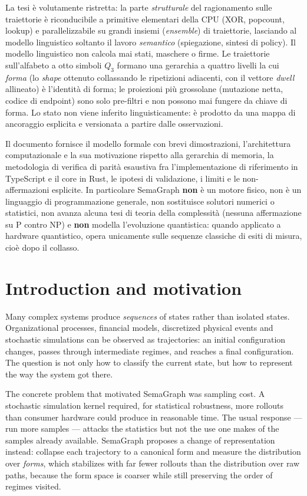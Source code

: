 \documentclass[11pt,a4paper]{article}
\begin{document}
La tesi è volutamente ristretta: la parte \emph{strutturale} del ragionamento
sulle traiettorie è riconducibile a primitive elementari della CPU (XOR, popcount,
lookup) e parallelizzabile su grandi insiemi (\emph{ensemble}) di traiettorie,
lasciando al modello linguistico soltanto il lavoro \emph{semantico} (spiegazione,
sintesi di policy). Il modello linguistico non calcola mai stati, maschere o
firme. Le traiettorie sull'alfabeto a otto simboli $Q_3$ formano una gerarchia a
quattro livelli la cui \emph{forma} (lo \emph{shape} ottenuto collassando le
ripetizioni adiacenti, con il vettore \emph{dwell} allineato) è l'identità di
forma; le proiezioni più grossolane (mutazione netta, codice di endpoint) sono
solo pre-filtri e non possono mai fungere da chiave di forma. Lo stato non viene
inferito linguisticamente: è prodotto da una mappa di ancoraggio esplicita e
versionata a partire dalle osservazioni.

Il documento fornisce il modello formale con brevi dimostrazioni, l'architettura
computazionale e la sua motivazione rispetto alla gerarchia di memoria, la
metodologia di verifica di parità esaustiva fra l'implementazione di riferimento
in TypeScript e il core in Rust, le ipotesi di validazione, i limiti e le
non-affermazioni esplicite. In particolare SemaGraph \textbf{non} è un motore
fisico, non è un linguaggio di programmazione generale, non sostituisce solutori
numerici o statistici, non avanza alcuna tesi di teoria della complessità (nessuna
affermazione su P contro NP) e \textbf{non} modella l'evoluzione quantistica:
quando applicato a hardware quantistico, opera unicamente sulle sequenze classiche
di esiti di misura, cioè dopo il collasso.

\tableofcontents
\bigskip

\section{Introduction and motivation}
Many complex systems produce \emph{sequences} of states rather than isolated
states. Organizational processes, financial models, discretized physical events
and stochastic simulations can be observed as trajectories: an initial
configuration changes, passes through intermediate regimes, and reaches a final
configuration. The question is not only how to classify the current state, but how
to represent the way the system got there.

The concrete problem that motivated SemaGraph was sampling cost. A stochastic
simulation kernel required, for statistical robustness, more rollouts than
consumer hardware could produce in reasonable time. The usual response --- run
more samples --- attacks the statistics but not the use one makes of the samples
already available. SemaGraph proposes a change of representation instead: collapse
each trajectory to a canonical form and measure the distribution over \emph{forms},
which stabilizes with far fewer rollouts than the distribution over raw paths,
because the form space is coarser while still preserving the order of regimes
visited.
\end{document}
